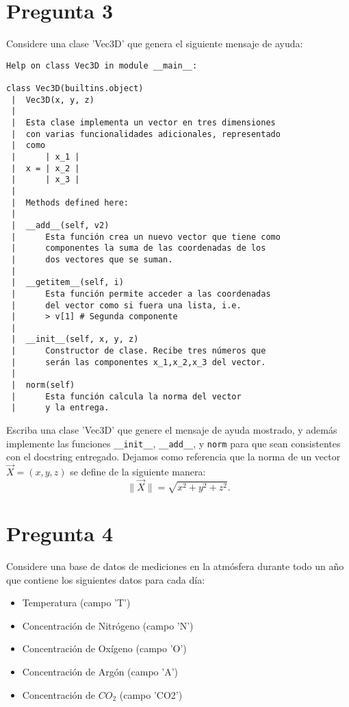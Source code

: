\documentclass{article}
\begin{document}
\section*{Pregunta 3}
Considere una clase 'Vec3D' que genera el siguiente mensaje de ayuda:
    \begin{verbatim}
Help on class Vec3D in module __main__:

class Vec3D(builtins.object)
 |  Vec3D(x, y, z)
 |  
 |  Esta clase implementa un vector en tres dimensiones
 |  con varias funcionalidades adicionales, representado 
 |  como 
 |      | x_1 |
 |  x = | x_2 |
 |      | x_3 |
 |  
 |  Methods defined here:
 |  
 |  __add__(self, v2)
 |      Esta función crea un nuevo vector que tiene como 
 |      componentes la suma de las coordenadas de los
 |      dos vectores que se suman.
 |  
 |  __getitem__(self, i)
 |      Esta función permite acceder a las coordenadas 
 |      del vector como si fuera una lista, i.e.
 |      > v[1] # Segunda componente
 |  
 |  __init__(self, x, y, z)
 |      Constructor de clase. Recibe tres números que 
 |      serán las componentes x_1,x_2,x_3 del vector.
 |  
 |  norm(self)
 |      Esta función calcula la norma del vector
 |      y la entrega.

    \end{verbatim}
Escriba una clase 'Vec3D' que genere el mensaje de ayuda mostrado, y además implemente las funciones \texttt{\_\_init\_\_}, \texttt{\_\_add\_\_}, y \texttt{norm} para que sean consistentes con el docstring entregado. Dejamos como referencia que la norma de un vector $\vec X = (x,y,z)$ se define de la siguiente manera:
    $$ \| \vec X \| = \sqrt{x^2 + y^2 + z^2} . $$
\section*{Pregunta 4}
Considere una base de datos de mediciones en la atmósfera durante todo un año que contiene los siguientes datos para cada día: 
    \begin{itemize}
        \item Temperatura (campo 'T')
        \item Concentración de Nitrógeno (campo 'N')
        \item Concentración de Oxígeno (campo 'O')
        \item Concentración de Argón (campo 'A')
        \item Concentración de $CO_2$ (campo 'CO2')
    \end{itemize}
\end{document}
